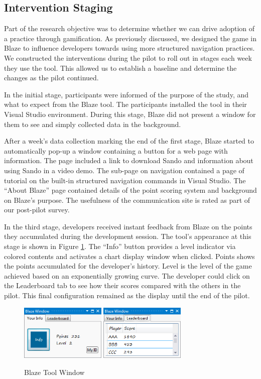\documentclass{sig-alternate}
\begin{document}
\subsection{Intervention Staging}

Part of the research objective was to determine whether we can drive adoption of a practice through gamification.  As previously discussed, we designed the game in Blaze to influence developers towards using more structured navigation practices.  We constructed the interventions during the pilot to roll out in stages each week they use the tool.  This allowed us to establish a baseline and determine the changes as the pilot continued.

In the initial stage, participants were informed of the purpose of the study, and what to expect from the Blaze tool.  The participants installed the tool in their Visual Studio environment.  During this stage, Blaze did not present a window for them to see and simply collected data in the background.   

After a week's data collection marking the end of the first stage, Blaze started to automatically pop-up a window containing a button for a web page with information.  The page included a link to download Sando  and information about using Sando in a video demo.  The sub-page on navigation contained a page of tutorial on the built-in structured navigation commands in Visual Studio.  The ``About Blaze'' page contained details of the point scoring system and background on Blaze's purpose.  The usefulness of the communication site is rated as part of our post-pilot  survey.

In the third stage, developers received instant feedback from Blaze on the points they accumulated during the development session.  The tool's appearance at this stage is shown in Figure \ref{fig:blazeWindow}.  The ``Info'' button provides a level indicator via colored contents and activates a chart display window when clicked.  Points shows the points accumulated for the developer's history.  Level is the level of the game achieved based on an exponentially growing curve.   The developer could click on the Leaderboard tab to see how their scores compared with the others in the pilot.  This final configuration remained as the display until the end of the pilot.  

\begin{figure}
	\centering
	\includegraphics[width=1.6in]{blazeWindow.png}
\includegraphics[width=1.6in]{blazeLeaderboard.png}
	\caption{Blaze Tool Window}
	\label{fig:blazeWindow}
\end{figure}
\end{document}
